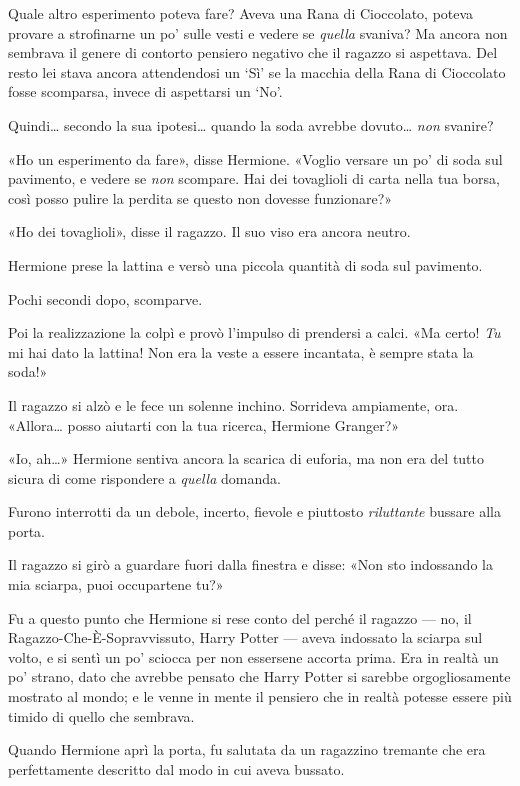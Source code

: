 Quale altro esperimento poteva fare? Aveva una Rana di Cioccolato, poteva provare a strofinarne un po’ sulle vesti e vedere se \textit{quella} svaniva? Ma ancora non sembrava il genere di contorto pensiero negativo che il ragazzo si aspettava. Del resto lei stava ancora attendendosi un ‘Sì’ se la macchia della Rana di Cioccolato fosse scomparsa, invece di aspettarsi un ‘No’.

Quindi… secondo la sua ipotesi… quando la soda avrebbe dovuto… \textit{non} svanire?

«Ho un esperimento da fare», disse Hermione. «Voglio versare un po’ di soda sul pavimento, e vedere se \textit{non} scompare. Hai dei tovaglioli di carta nella tua borsa, così posso pulire la perdita se questo non dovesse funzionare?»

«Ho dei tovaglioli», disse il ragazzo. Il suo viso era ancora neutro.

Hermione prese la lattina e versò una piccola quantità di soda sul pavimento.

Pochi secondi dopo, scomparve.

Poi la realizzazione la colpì e provò l’impulso di prendersi a calci. «Ma certo! \textit{Tu} mi hai dato la lattina! Non era la veste a essere incantata, è sempre stata la soda!»

Il ragazzo si alzò e le fece un solenne inchino. Sorrideva ampiamente, ora. «Allora… posso aiutarti con la tua ricerca, Hermione Granger?»

«Io, ah…» Hermione sentiva ancora la scarica di euforia, ma non era del tutto sicura di come rispondere a \textit{quella} domanda.

Furono interrotti da un debole, incerto, fievole e piuttosto \textit{riluttante} bussare alla porta.

Il ragazzo si girò a guardare fuori dalla finestra e disse: «Non sto indossando la mia sciarpa, puoi occupartene tu?»

Fu a questo punto che Hermione si rese conto del perché il ragazzo — no, il Ragazzo-Che-È-Sopravvissuto, Harry Potter — aveva indossato la sciarpa sul volto, e si sentì un po’ sciocca per non essersene accorta prima. Era in realtà un po’ strano, dato che avrebbe pensato che Harry Potter si sarebbe orgogliosamente mostrato al mondo; e le venne in mente il pensiero che in realtà potesse essere più timido di quello che sembrava.

Quando Hermione aprì la porta, fu salutata da un ragazzino tremante che era perfettamente descritto dal modo in cui aveva bussato.

